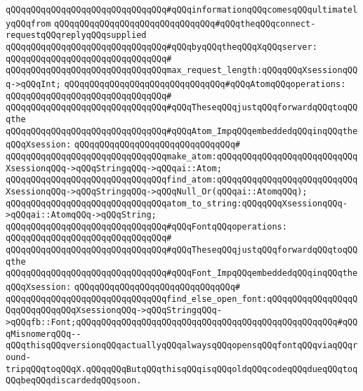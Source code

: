 \verb|qQQqqQQqqQQqqQQqqQQqqQQqqQQqqQQq#qQQqinformationqQQqcomesqQQqultimatelyqQQqfrom|\newline
\verb|qQQqqQQqqQQqqQQqqQQqqQQqqQQqqQQq#qQQqtheqQQqconnect-requestqQQqreplyqQQqsupplied|\newline
\verb|qQQqqQQqqQQqqQQqqQQqqQQqqQQqqQQq#qQQqbyqQQqtheqQQqXqQQqserver:|\newline
\verb|qQQqqQQqqQQqqQQqqQQqqQQqqQQqqQQq#|\newline
\verb|qQQqqQQqqQQqqQQqqQQqqQQqqQQqqQQqmax_request_length:qQQqqQQqXsessionqQQq->qQQqInt;|\newline
\newline
\newline
\newline
\verb|qQQqqQQqqQQqqQQqqQQqqQQqqQQqqQQq#qQQqAtomqQQqoperations:|\newline
\verb|qQQqqQQqqQQqqQQqqQQqqQQqqQQqqQQq#|\newline
\verb|qQQqqQQqqQQqqQQqqQQqqQQqqQQqqQQq#qQQqTheseqQQqjustqQQqforwardqQQqtoqQQqthe|\newline
\verb|qQQqqQQqqQQqqQQqqQQqqQQqqQQqqQQq#qQQqAtom_ImpqQQqembeddedqQQqinqQQqtheqQQqXsession:|\newline
\verb|qQQqqQQqqQQqqQQqqQQqqQQqqQQqqQQq#|\newline
\verb|qQQqqQQqqQQqqQQqqQQqqQQqqQQqqQQqmake_atom:qQQqqQQqqQQqqQQqqQQqqQQqqQQqXsessionqQQq->qQQqStringqQQq->qQQqai::Atom;|\newline
\verb|qQQqqQQqqQQqqQQqqQQqqQQqqQQqqQQqfind_atom:qQQqqQQqqQQqqQQqqQQqqQQqqQQqXsessionqQQq->qQQqStringqQQq->qQQqNull_Or(qQQqai::AtomqQQq);|\newline
\verb|qQQqqQQqqQQqqQQqqQQqqQQqqQQqqQQqatom_to_string:qQQqqQQqXsessionqQQq->qQQqai::AtomqQQq->qQQqString;|\newline
\newline
\newline
\newline
\verb|qQQqqQQqqQQqqQQqqQQqqQQqqQQqqQQq#qQQqFontqQQqoperations:|\newline
\verb|qQQqqQQqqQQqqQQqqQQqqQQqqQQqqQQq#|\newline
\verb|qQQqqQQqqQQqqQQqqQQqqQQqqQQqqQQq#qQQqTheseqQQqjustqQQqforwardqQQqtoqQQqthe|\newline
\verb|qQQqqQQqqQQqqQQqqQQqqQQqqQQqqQQq#qQQqFont_ImpqQQqembeddedqQQqinqQQqtheqQQqXsession:|\newline
\verb|qQQqqQQqqQQqqQQqqQQqqQQqqQQqqQQq#|\newline
\verb|qQQqqQQqqQQqqQQqqQQqqQQqqQQqqQQqfind_else_open_font:qQQqqQQqqQQqqQQqqQQqqQQqqQQqqQQqXsessionqQQq->qQQqStringqQQq->qQQqfb::Font;qQQqqQQqqQQqqQQqqQQqqQQqqQQqqQQqqQQqqQQqqQQqqQQqqQQq#qQQqMisnomerqQQq--qQQqthisqQQqversionqQQqactuallyqQQqalwaysqQQqopensqQQqfontqQQqviaqQQqround-tripqQQqtoqQQqX.qQQqqQQqButqQQqthisqQQqisqQQqoldqQQqcodeqQQqdueqQQqtoqQQqbeqQQqdiscardedqQQqsoon.|\newline
